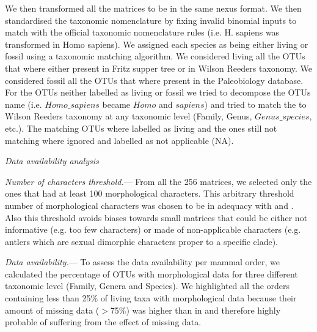 \documentclass[12pt,letterpaper]{article}
\renewcommand{\subsection}[1]{%
\bigskip
\begin{center}
\begin{large}
\normalfont\itshape #1
\end{large}
\end{center}}
\renewcommand{\subsubsection}[1]{%
\vspace{2ex}
\noindent
\textit{#1.}---}
\begin{document}
We then transformed all the matrices to be in the same nexus format. We then standardised the taxonomic nomenclature by fixing invalid binomial inputs to match with the official taxonomic nomenclature rules (i.e. H. sapiens was transformed in Homo sapiens). We assigned each species as being either living or fossil using a taxonomic matching algorithm. We considered living all the OTUs that where either present in Fritz supper tree or in Wilson Reeders taxonomy. We considered fossil all the OTUs that where present in the Paleobiology database. For the OTUs neither labelled as living or fossil we tried to decompose the OTUs name (i.e. $Homo\_sapiens$ became $Homo$ and $sapiens$) and tried to match the to Wilson Reeders taxonomy at any taxonomic level (Family, Genus, $Genus\_species$, etc.). The matching OTUs where labelled as living and the ones still not matching where ignored and labelled as not applicable (NA).

\subsection{Data availability analysis}
\subsubsection{Number of characters threshold}
From all the 256 %
matrices, we selected only the ones that had at least 100 morphological characters. This arbitrary threshold number of morphological characters was chosen to be in adequacy with \cite{GuillermeCooper} and \cite{harrisonamong-character2014}. Also this threshold avoids biases towards small matrices that could be either not informative (e.g. too few characters) or made of non-applicable characters (e.g. antlers which are sexual dimorphic characters proper to a specific clade).

\subsubsection{Data availability}
To assess the data availability per mammal order, we calculated the percentage of OTUs with morphological data for three different taxonomic level (Family, Genera and Species). We highlighted all the orders containing less than 25\% of living taxa with morphological data because their amount of missing data ($>$75\%) was higher than in \cite{GuillermeCooper} and therefore highly probable of suffering from the effect of missing data. 
\end{document}
